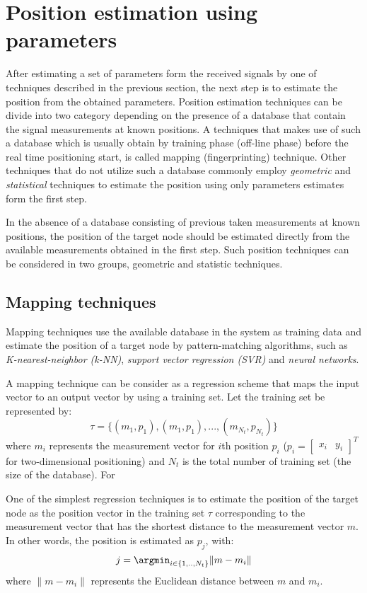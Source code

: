\documentclass[../templatetop.tex]{subfiles}
\begin{document}
\section{Position estimation using parameters}

After estimating a  set of parameters form the received signals by one of techniques described in the previous section, the next step is to estimate the position from the obtained parameters.
Position estimation techniques can be divide into two category depending on the presence of a database that contain the signal measurements at known positions. A techniques that makes use of such a database which is usually obtain by training phase (off-line phase) before the real time positioning start, is called mapping (fingerprinting) technique. Other techniques that do not utilize such a database commonly employ \textit{geometric} and \textit{statistical} techniques to estimate the position using only parameters estimates form the first step.

\noindent In the absence of a database consisting of previous taken measurements at known positions, the position of the target node should be estimated directly from the available measurements obtained in the first step. Such position techniques can be considered in two groups, geometric and statistic techniques.

\subsection{Mapping techniques}
Mapping techniques use the available database in the system as training data and estimate the position of a target node by pattern-matching algorithms, such as \textit{K-nearest-neighbor (k-NN)}, \textit{support vector regression (SVR)} and \textit{neural networks}.

A mapping technique can be consider as a regression scheme that maps the input vector to an output vector by using a training set. Let the training set be represented by:
\begin{equation}
    \tau = \{(m_1, p_1), (m_1, p_1),..., (m_{N_t}, p_{N_t})\}
\end{equation}
where $m_i$ represents the measurement vector for $i$th position $p_i$ ($p_i=\begin{bmatrix} x_i & y_i \end{bmatrix}^T$ for two-dimensional positioning) and $N_t$ is the total number of training set (the size of the database). For

One of the simplest regression techniques is to estimate the position of the target node as the position vector in the training set $\tau$ corresponding to the measurement vector that has the shortest distance to the measurement vector $m$. In other words, the position is estimated as $p_j$, with:
\begin{equation}
    j = \argmin_{i \in \{1,..,N_t\}} \lVert m - m_i \rVert
\end{equation}
where $\lVert m - m_i \rVert$ represents the Euclidean distance between $m$ and $m_i$.
\end{document}
